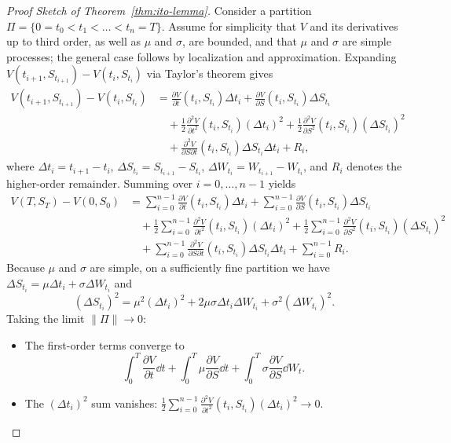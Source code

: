 \begin{proof}[Proof Sketch of Theorem~\ref{thm:ito-lemma}]
Consider a partition $\Pi = \{0 = t_0 < t_1 < \dots < t_n = T\}$. Assume for simplicity that $V$ and its derivatives up to third order, as well as $\mu$ and $\sigma$, are bounded, and that $\mu$ and $\sigma$ are simple processes; the general case follows by localization and approximation. Expanding $V(t_{i+1}, S_{t_{i+1}}) - V(t_i, S_{t_i})$ via Taylor's theorem gives
\begin{align*}
V(t_{i+1}, S_{t_{i+1}}) - V(t_i, S_{t_i})
&= \frac{\partial V}{\partial t}(t_i, S_{t_i})\Delta t_i + \frac{\partial V}{\partial S}(t_i, S_{t_i})\Delta S_{t_i} \\
&\quad + \frac{1}{2}\frac{\partial^2 V}{\partial t^2}(t_i, S_{t_i})(\Delta t_i)^2 + \frac{1}{2}\frac{\partial^2 V}{\partial S^2}(t_i, S_{t_i})(\Delta S_{t_i})^2 \\
&\quad + \frac{\partial^2 V}{\partial S \partial t}(t_i, S_{t_i})\Delta S_{t_i}\Delta t_i + R_i,
\end{align*}
where $\Delta t_i = t_{i+1} - t_i$, $\Delta S_{t_i} = S_{t_{i+1}} - S_{t_i}$, $\Delta W_{t_i} = W_{t_{i+1}} - W_{t_i}$, and $R_i$ denotes the higher-order remainder. Summing over $i = 0, \dots, n-1$ yields
\begin{align*}
V(T, S_T) - V(0, S_0)
&= \sum_{i=0}^{n-1} \frac{\partial V}{\partial t}(t_i, S_{t_i})\Delta t_i + \sum_{i=0}^{n-1} \frac{\partial V}{\partial S}(t_i, S_{t_i})\Delta S_{t_i} \\
&\quad + \frac{1}{2}\sum_{i=0}^{n-1} \frac{\partial^2 V}{\partial t^2}(t_i, S_{t_i})(\Delta t_i)^2 + \frac{1}{2}\sum_{i=0}^{n-1} \frac{\partial^2 V}{\partial S^2}(t_i, S_{t_i})(\Delta S_{t_i})^2 \\
&\quad + \sum_{i=0}^{n-1} \frac{\partial^2 V}{\partial S \partial t}(t_i, S_{t_i})\Delta S_{t_i}\Delta t_i + \sum_{i=0}^{n-1} R_i.
\end{align*}
Because $\mu$ and $\sigma$ are simple, on a sufficiently fine partition we have $\Delta S_{t_i} = \mu \Delta t_i + \sigma \Delta W_{t_i}$ and
\[
(\Delta S_{t_i})^2 = \mu^2 (\Delta t_i)^2 + 2\mu\sigma \Delta t_i \Delta W_{t_i} + \sigma^2 (\Delta W_{t_i})^2.
\]
Taking the limit $\|\Pi\| \to 0$:
\begin{itemize}
    \item The first-order terms converge to
    \[
    \int_0^T \frac{\partial V}{\partial t}\dd t + \int_0^T \mu \frac{\partial V}{\partial S}\dd t + \int_0^T \sigma \frac{\partial V}{\partial S}\dd W_t.
    \]
    \item The $(\Delta t_i)^2$ sum vanishes: $\frac{1}{2}\sum_{i=0}^{n-1} \frac{\partial^2 V}{\partial t^2}(t_i, S_{t_i})(\Delta t_i)^2 \to 0$.

\end{itemize}
\end{proof}
